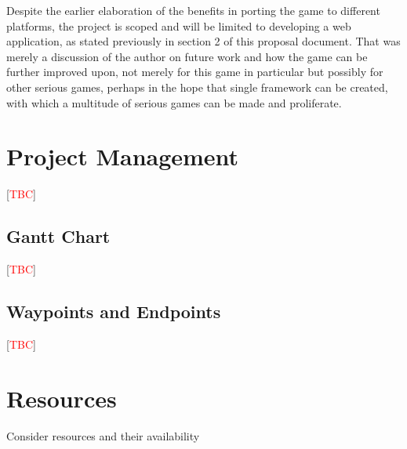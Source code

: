 \documentclass[a4paper]{article}
\newcommand{\comment}[1]{[\textcolor{red}{#1}]} %
\begin{document}
Despite the earlier elaboration of the benefits in porting the game to different platforms, the project is scoped and will be limited to developing a web application, as stated previously in section 2 of this proposal document. That was merely a discussion of the author on future work and how the game can be further improved upon, not merely for this game in particular but possibly for other serious games, perhaps in the hope that single framework can be created, with which a multitude of serious games can be made and proliferate.

\section{Project Management}
\comment{TBC}
\subsection{Gantt Chart}
\comment{TBC}
\subsection{Waypoints and Endpoints}
\comment{TBC}

\section{Resources} %
Consider resources and their availability

\newpage
\printbibliography
\end{document}
